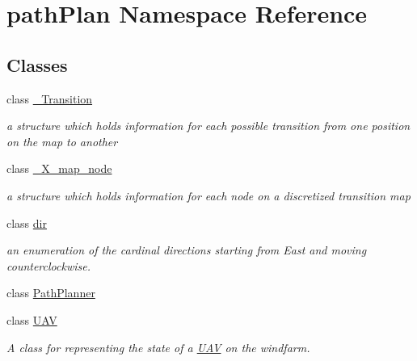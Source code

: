 \hypertarget{namespacepath_plan}{}\section{path\+Plan Namespace Reference}
\label{namespacepath_plan}
\subsection*{Classes}
\begin{DoxyCompactItemize}
\item 
class \mbox{\hyperlink{classpath_plan_1_1___transition}{\+\_\+\+Transition}}
\begin{DoxyCompactList}\small\item\em a structure which holds information for each possible transition from one position on the map to another \end{DoxyCompactList}\item 
class \mbox{\hyperlink{classpath_plan_1_1___x__map__node}{\+\_\+\+X\+\_\+map\+\_\+node}}
\begin{DoxyCompactList}\small\item\em a structure which holds information for each node on a discretized transition map \end{DoxyCompactList}\item 
class \mbox{\hyperlink{classpath_plan_1_1dir}{dir}}
\begin{DoxyCompactList}\small\item\em an enumeration of the cardinal directions starting from East and moving counterclockwise. \end{DoxyCompactList}\item 
class \mbox{\hyperlink{classpath_plan_1_1_path_planner}{Path\+Planner}}
\item 
class \mbox{\hyperlink{classpath_plan_1_1_u_a_v}{U\+AV}}
\begin{DoxyCompactList}\small\item\em A class for representing the state of a \mbox{\hyperlink{classpath_plan_1_1_u_a_v}{U\+AV}} on the windfarm. \end{DoxyCompactList}\end{DoxyCompactItemize}
